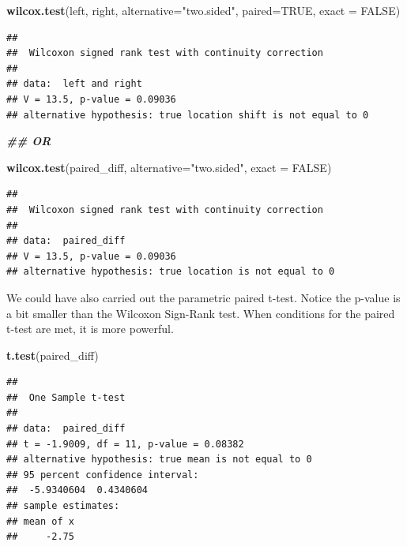 \documentclass[
]{book}
\newenvironment{Shaded}{\begin{snugshade}}{\end{snugshade}}
\newcommand{\AttributeTok}[1]{\textcolor[rgb]{0.13,0.29,0.53}{#1}}
\newcommand{\ConstantTok}[1]{\textcolor[rgb]{0.56,0.35,0.01}{#1}}
\newcommand{\DocumentationTok}[1]{\textcolor[rgb]{0.56,0.35,0.01}{\textbf{\textit{#1}}}}
\newcommand{\FunctionTok}[1]{\textcolor[rgb]{0.13,0.29,0.53}{\textbf{#1}}}
\newcommand{\NormalTok}[1]{#1}
\newcommand{\StringTok}[1]{\textcolor[rgb]{0.31,0.60,0.02}{#1}}
\theoremstyle{definition}
\theoremstyle{definition}
\theoremstyle{definition}
\theoremstyle{definition}
\theoremstyle{remark}
\begin{document}
\begin{Shaded}
\begin{Highlighting}[]
\FunctionTok{wilcox.test}\NormalTok{(left, right, }\AttributeTok{alternative=}\StringTok{"two.sided"}\NormalTok{, }\AttributeTok{paired=}\ConstantTok{TRUE}\NormalTok{, }\AttributeTok{exact =} \ConstantTok{FALSE}\NormalTok{)}
\end{Highlighting}
\end{Shaded}

\begin{verbatim}
## 
##  Wilcoxon signed rank test with continuity correction
## 
## data:  left and right
## V = 13.5, p-value = 0.09036
## alternative hypothesis: true location shift is not equal to 0
\end{verbatim}

\begin{Shaded}
\begin{Highlighting}[]
\DocumentationTok{\#\# OR}

\FunctionTok{wilcox.test}\NormalTok{(paired\_diff, }\AttributeTok{alternative=}\StringTok{"two.sided"}\NormalTok{, }\AttributeTok{exact =} \ConstantTok{FALSE}\NormalTok{)}
\end{Highlighting}
\end{Shaded}

\begin{verbatim}
## 
##  Wilcoxon signed rank test with continuity correction
## 
## data:  paired_diff
## V = 13.5, p-value = 0.09036
## alternative hypothesis: true location is not equal to 0
\end{verbatim}

We could have also carried out the parametric paired t-test. Notice the p-value is a bit smaller than the Wilcoxon Sign-Rank test. When conditions for the paired t-test are met, it is more powerful.

\begin{Shaded}
\begin{Highlighting}[]
\FunctionTok{t.test}\NormalTok{(paired\_diff)}
\end{Highlighting}
\end{Shaded}

\begin{verbatim}
## 
##  One Sample t-test
## 
## data:  paired_diff
## t = -1.9009, df = 11, p-value = 0.08382
## alternative hypothesis: true mean is not equal to 0
## 95 percent confidence interval:
##  -5.9340604  0.4340604
## sample estimates:
## mean of x 
##     -2.75
\end{verbatim}
\end{document}
